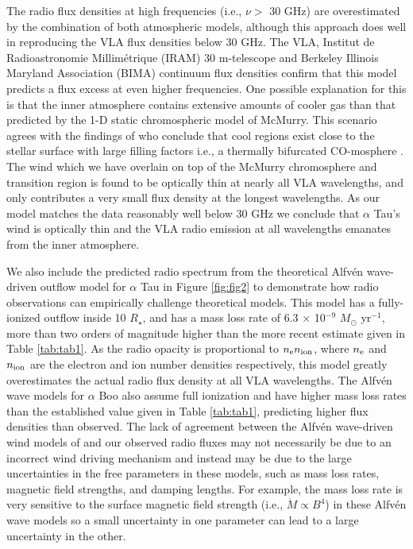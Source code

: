 \documentclass[iop]{emulateapj}
\begin{document}
The radio flux densities at high frequencies (i.e., $\nu >$ 30 GHz) are overestimated by the combination of both atmospheric models, although this approach does well in reproducing the VLA flux densities below 30 GHz. The VLA, Institut de Radioastronomie Millim\'{e}trique (IRAM) 30 m-telescope and Berkeley Illinois Maryland Association (BIMA) continuum flux densities confirm that this model predicts a flux excess at even higher frequencies. One possible explanation for this is that the inner atmosphere contains extensive amounts of cooler gas than that predicted by the 1-D static chromospheric model of McMurry. This scenario agrees with the findings of \cite{1994ApJ...423..806W} who conclude that cool regions exist close to the stellar surface with large filling factors i.e., a thermally bifurcated CO-mosphere \citep{1996IAUS..176..371A}. The wind which we have overlain on top of the McMurry chromosphere and transition region is found to be optically thin at nearly all VLA wavelengths, and only contributes a very small flux density at the longest wavelengths. As our model matches the data reasonably well below 30 GHz we conclude that $\alpha$ Tau's wind is optically thin and the VLA radio emission at all wavelengths emanates from the inner atmosphere. 

We also include the predicted radio spectrum from the theoretical Alfv\'{e}n wave-driven outflow model for $\alpha$ Tau \citep{1989AcA....39..51K} in Figure \ref{fig:fig2} to demonstrate how radio observations can empirically challenge theoretical models. This model has a fully-ionized outflow inside 10 $R_{\star}$, and has a mass loss rate of  6.3 $\times$ 10$^{-9}$ $M_{\odot}$ yr$^{-1}$, more than two orders of magnitude higher than the more recent estimate given in Table \ref{tab:tab1}. As the radio opacity is proportional to $n _{\rm{e}} n _{\rm{ion}}$, where $n_{\rm{e}}$ and $n_{\rm{ion}}$ are the electron and ion number densities respectively, this model greatly overestimates the actual radio flux density at all VLA wavelengths. The Alfv\'{e}n wave models for $\alpha$ Boo \citep{1988AcA....38..107K} also assume full ionization and have higher mass loss rates than the established value given in Table \ref{tab:tab1}, predicting higher flux densities than observed. The lack of agreement between the Alfv\'en wave-driven wind models of \cite{1988AcA....38..107K,1989AcA....39..51K} and our observed radio fluxes may not necessarily be due to an incorrect  wind driving mechanism and instead may be due to the large uncertainties in the free parameters in these models, such as mass loss rates, magnetic field strengths, and damping lengths. For example, the mass loss rate is very sensitive to the surface magnetic field strength (i.e., $\dot{M} \propto B^4$) in these Alfv\'en wave models \citep{1983ApJ...275..808H} so a small uncertainty in one parameter can lead to a large uncertainty in the other. 
\end{document}

